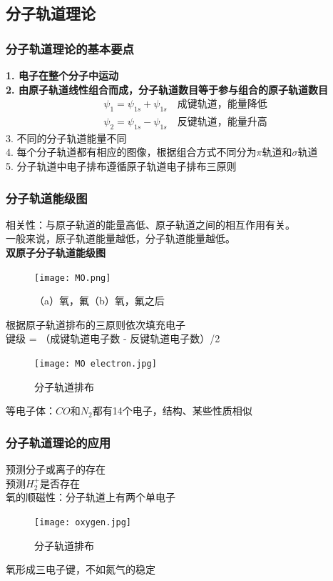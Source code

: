 \documentclass[utf8,a4paper,12pt]{ctexart}
\begin{document}
\subsection{分子轨道理论}
\subsubsection{分子轨道理论的基本要点}
{\bf 1. 电子在整个分子中运动}\\
{\bf 2. 由原子轨道线性组合而成，分子轨道数目等于参与组合的原子轨道数目}
\begin{align*}
\psi_1 = \psi_{1s} + \psi_{1s}\quad\text{成键轨道，能量降低} \\
\psi_2 = \psi_{1s} - \psi_{1s}\quad\text{反键轨道，能量升高}
\end{align*}
3. 不同的分子轨道能量不同\\
4. 每个分子轨道都有相应的图像，根据组合方式不同分为$\pi$轨道和$\sigma$轨道\\
5. 分子轨道中电子排布遵循原子轨道电子排布三原则
\subsubsection{分子轨道能级图}
相关性：与原子轨道的能量高低、原子轨道之间的相互作用有关。\\
一般来说，原子轨道能量越低，分子轨道能量越低。\\
{\bf 双原子分子轨道能级图}\\
\begin{figure}[H]
\centering
\texttt{[image: MO.png]}
\caption{（a）氧，氟（b）氧，氟之后}
\end{figure}
根据原子轨道排布的三原则依次填充电子\\
键级 = （成键轨道电子数 - 反键轨道电子数）/2\\
\begin{figure}[H]
\centering
\texttt{[image: MO electron.jpg]}
\caption{分子轨道排布}
\end{figure}
等电子体：$CO$和$N_2$都有14个电子，结构、某些性质相似\\
\subsubsection{分子轨道理论的应用}
预测分子或离子的存在\\
{\small \kaishu 预测$H_2^+$是否存在}\\
氧的顺磁性：分子轨道上有两个单电子
\begin{figure}[H]
\centering
\texttt{[image: oxygen.jpg]}
\caption{分子轨道排布}
\end{figure}
氧形成三电子键，不如氮气的稳定\\
\end{document}
